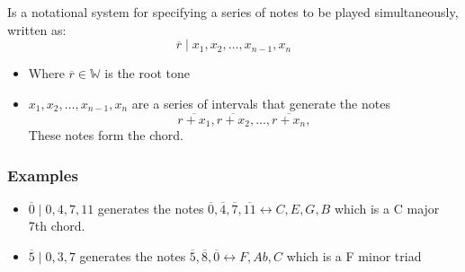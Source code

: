 \documentclass[preview]{standalone}
\begin{document}
\begin{center}
Is a notational system for specifying a series of notes to be played simultaneously, written as:
              \[
                  \overline{r} \mid x_{1} , x_{2} , \dotsc  , x_{n - 1} , x_{n}
              \]
              \begin{itemize}
                \item Where $ \overline{r} \in \mathbb{W}$ is the root tone 
                \item  $ x_{1} , x_{2} , \dotsc  , x_{n - 1} , x_{n}$ are a series of intervals that generate the notes
                  \[
                  \overline{r  +  x_{1}}, \overline{r  +  x_{2}}, \ldots, \overline{r  +  x_{n}}, 
                  \]
                  These notes form the chord.
              \end{itemize}
              \subsubsection*{Examples}
              \begin{itemize}
                \item $ \overline{0} \mid 0, 4, 7, 11$ generates the notes $ \overline{0}, \overline{4}, \overline{7}, \overline{11} \leftrightarrow C, E, G, B$ which is a C major 7th chord.
                \item $ \overline{5} \mid 0, 3, 7$ generates the notes $ \overline{5}, \overline{8}, \overline{0} \leftrightarrow F, Ab, C$ which is a F minor triad
              \end{itemize}
\end{center}
\end{document}

